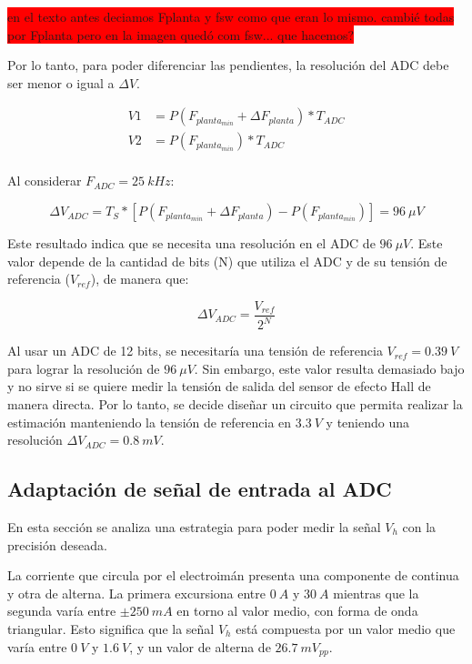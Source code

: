 \colorbox{red}{en el texto antes deciamos Fplanta y fsw como que eran lo mismo. cambié todas por Fplanta pero en la imagen quedó com fsw... que hacemos?}

 Por lo tanto, para poder diferenciar las pendientes, la resolución del ADC debe ser menor o igual a $\Delta V$.

\begin{equation} 
	\begin{aligned}
		V1 &= P(F_{planta_{min}} + \Delta F_{planta})* T_{ADC} \\
		V2 &= P(F_{planta_{min}})* T_{ADC} \\		 
	\end{aligned}
\end{equation}

 Al considerar $F_{ADC} = 25\:kHz$:

\begin{equation} 
	\Delta V_{ADC} = T_S * [P(F_{planta_{min}} + \Delta F_{planta}) - P(F_{planta_{min}})] = 96\:\mu V
\end{equation}



 Este resultado indica que se necesita una resolución en el ADC de $96\:\mu V$. Este valor depende de la cantidad de bits (N) que utiliza el ADC y de su tensión de referencia ($V_{ref}$), de manera que:
 
 \begin{equation*}
 	\Delta V_{ADC}=\frac{V_{ref}}{2^N}
 \end{equation*}

Al usar un ADC de 12 bits, se necesitaría una tensión de referencia $V_{ref} = 0.39\:V$ para lograr la resolución de $96\:\mu V$. Sin embargo, este valor resulta demasiado bajo y no sirve si se quiere medir la tensión de salida del sensor de efecto Hall de manera directa. Por lo tanto, se decide diseñar un circuito que permita realizar la estimación manteniendo la tensión de referencia en $3.3\:V$ y teniendo una resolución $\Delta V_{ADC}=0.8\:mV$.

\subsection{Adaptación de señal de entrada al ADC}

En esta sección se analiza una estrategia para poder medir la señal $V_h$ con la precisión deseada.

La corriente que circula por el electroimán presenta una componente de continua y otra de alterna. La primera excursiona entre $0\:A$ y $30\:A$ mientras que la segunda varía entre $\pm 250\:mA$ en torno al valor medio, con forma de onda triangular. Esto significa que la señal $V_h$ está compuesta por un valor medio que varía entre $0\:V$ y $1.6\:V$, y un valor de alterna de $26.7\:mV_{pp}$.

